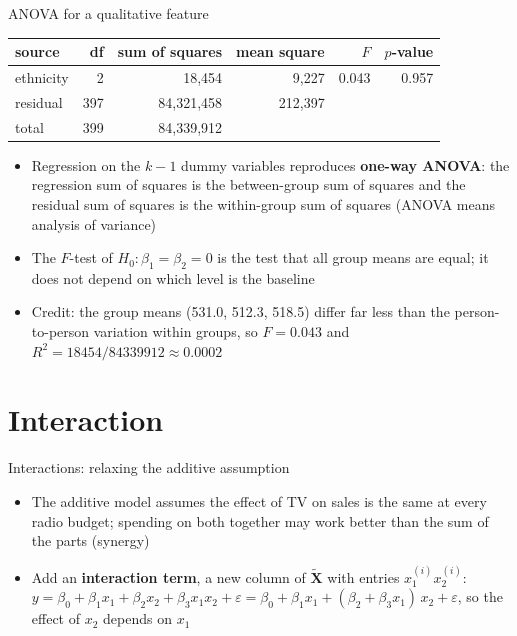 \begin{frame}{ANOVA for a qualitative feature}
    \begin{center}
        \small
        \begin{tabular}{lrrrrr}
            \toprule
            source & df & sum of squares & mean square & $F$ & $p$-value \\
            \midrule
            ethnicity & 2 & 18,454 & 9,227 & 0.043 & 0.957 \\
            residual & 397 & 84,321,458 & 212,397 & & \\
            total & 399 & 84,339,912 & & & \\
            \bottomrule
        \end{tabular}
    \end{center}
    \begin{itemize}
        \item Regression on the $k-1$ dummy variables reproduces \textbf{one-way ANOVA}: the regression sum of squares is the between-group sum of squares and the residual sum of squares is the within-group sum of squares (ANOVA means analysis of variance)
        \item The $F$-test of $H_0\colon \beta_1 = \beta_2 = 0$ is the test that all group means are equal; it does not depend on which level is the baseline
        \item Credit: the group means (531.0, 512.3, 518.5) differ far less than the person-to-person variation within groups, so $F = 0.043$ and $R^2 = 18454/84339912 \approx 0.0002$
    \end{itemize}
\end{frame}


\section{Interaction}


\begin{frame}{Interactions: relaxing the additive assumption}
    \begin{itemize}
        \item The additive model assumes the effect of TV on sales is the same at every radio budget; spending on both together may work better than the sum of the parts (synergy)
        \item Add an \textbf{interaction term}, a new column of $\tilde{\mathbf{X}}$ with entries $x_1^{(i)} x_2^{(i)}$: $y = \beta_0 + \beta_1 x_1 + \beta_2 x_2 + \beta_3 x_1 x_2 + \varepsilon = \beta_0 + \beta_1 x_1 + (\beta_2 + \beta_3 x_1)\, x_2 + \varepsilon$, so the effect of $x_2$ depends on $x_1$
    \end{itemize}
\end{frame}


